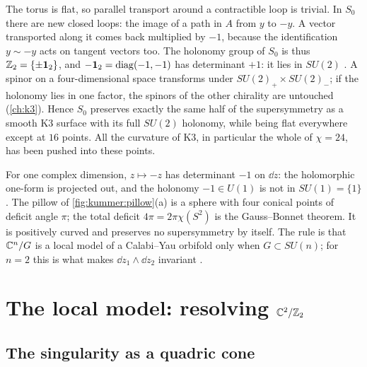 \begin{physicsbox}
The torus is flat, so parallel transport around a contractible loop is trivial. In $S_0$ there
are new closed loops: the image of a path in $A$ from $y$ to $-y$. A vector transported along
it comes back multiplied by $-1$, because the identification $y\sim-y$ acts on tangent
vectors too. The holonomy group of $S_0$ is thus $\mathbb{Z}_2=\{\pm\mathbf 1_2\}$, and
$-\mathbf 1_2=\operatorname{diag}(-1,-1)$ has determinant $+1$: it lies in $SU(2)$
. A spinor on a four-dimensional space transforms under
$SU(2)_+\times SU(2)_-$; if the holonomy lies in one factor, the spinors of the other
chirality are untouched (\cref{ch:k3}). Hence $S_0$ preserves exactly the same half of the
supersymmetry as a smooth K3 surface with its full $SU(2)$ holonomy, while being flat
everywhere except at $16$ points. All the curvature of K3, in particular the whole of
$\chi=24$, has been pushed into these points.
\end{physicsbox}

\begin{pitfallbox}
For one complex dimension, $z\mapsto-z$ has determinant $-1$ on $\dd z$: the holomorphic
one-form is projected out, and the holonomy $-1\in U(1)$ is not in $SU(1)=\{1\}$. The pillow
of \cref{fig:kummer:pillow}(a) is a sphere with four conical points of deficit angle $\pi$;
the total deficit $4\pi=2\pi\chi(S^2)$ is the Gauss--Bonnet theorem. It is positively
curved and preserves no supersymmetry by itself. The rule is that
$\mathbb{C}^n/G$ is a local model of a Calabi--Yau orbifold only when $G\subset SU(n)$; for $n=2$
this is what makes $\dd z_1\wedge\dd z_2$ invariant .
\end{pitfallbox}

\section{The local model: resolving \texorpdfstring{$\mathbb{C}^2/\mathbb{Z}_2$}{C2/Z2}}\label{sec:kummer:local}

\subsection{The singularity as a quadric cone}

